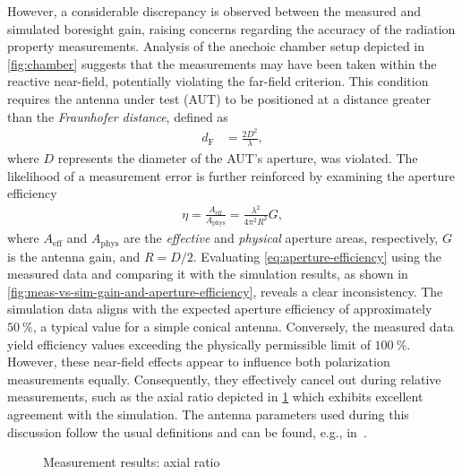 \documentclass[11pt,a4paper,twoside,openany]{report}
\begin{document}
However, a considerable discrepancy is observed between the measured and simulated boresight gain, raising concerns regarding the accuracy of the radiation property measurements. Analysis of the anechoic chamber setup depicted in \cref{fig:chamber} suggests that the measurements may have been taken within the reactive near-field, potentially violating the far-field criterion. This condition requires the antenna under test (AUT) to be positioned at a distance greater than the \emph{Fraunhofer distance}, defined as
\begin{align}
    \label{eq:farfield-condition}
    d_{\mathrm F} &= \frac{2D^2}{\lambda},
\end{align}
where $D$ represents the diameter of the AUT's aperture, was violated. The likelihood of a measurement error is further reinforced by examining the aperture efficiency
\begin{align}
    \label{eq:aperture-efficiency}
    \eta = \frac{A_{\mathrm{eff}}}{A_{\mathrm{phys}}} = \frac{\lambda^2}{4\pi^2R^2}G, 
\end{align}
where $A_{\mathrm{eff}}$ and $A_{\mathrm{phys}}$ are the \emph{effective} and \emph{physical} aperture areas, respectively, $G$ is the antenna gain, and $R = D/2$. Evaluating \cref{eq:aperture-efficiency} using the measured data and comparing it with the simulation results, as shown in \cref{fig:meas-vs-sim-gain-and-aperture-efficiency}, reveals a clear inconsistency. The simulation data aligns with the expected aperture efficiency of approximately $\qty{50}{\%}$, a typical value for a simple conical antenna. Conversely, the measured data yield efficiency values exceeding the physically permissible limit of $\qty{100}{\%}$. However, these near-field effects appear to influence both polarization measurements equally. Consequently, they effectively cancel out during relative measurements, such as the axial ratio depicted in \cref{fig:meas-vs-sim-axial-ratio} which exhibits excellent agreement with the simulation. The antenna parameters used during this discussion follow the usual definitions and can be found, e.g., in~\parencite{balanis:antenna-theory-analysis-and-design}.

\begin{figure}[!ht]
    \centering
    
    \caption{\label{fig:meas-vs-sim-axial-ratio}Measurement results: axial ratio}
\end{figure}
\end{document}

